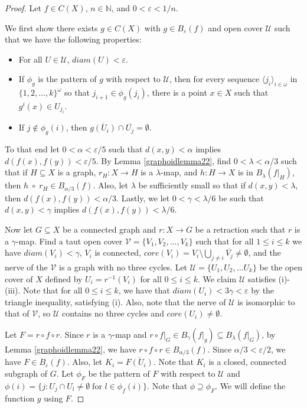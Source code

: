 \documentclass[10pt,a4paper]{amsart}
\numberwithin{equation}{section}
\begin{document}
\begin{proof}

Let $f\in C(X)$, $n\in \mathbb N$, and $0<\varepsilon<1/n$. 

We first show there exists $g\in C(X)$ with $g\in B_\varepsilon(f)$  and open cover $\mathcal{U}$ such that we have the following properties:
    \begin{itemize}
        \item[(i)]  For all $U\in \mathcal{U}$, $diam(U)<\varepsilon$.
        \item[(ii)] If $\phi_g$ is the pattern of $g$ with respect to $\mathcal{U}$, then for every sequence $\langle j_i \rangle_{i\in \omega}$ in $\{1,2,...,k\}^\omega$ so that $j_{i+1}\in \phi_g(j_i)$, there is a point $x\in X$ such that $g^i(x)\in U_{j_i}.$
        \item[(iii)] If $j\notin\phi_g(i)$, then $\overline{g(U_i)}\cap \overline{U_j}=\emptyset.$
    \end{itemize}


To that end let $0<\alpha<\varepsilon/5$ such that $d(x,y)<\alpha$ implies $d(f(x),f(y))<\varepsilon/5$. By Lemma \ref{graphoidlemma22}, find $0<\lambda<\alpha/3$ such that if $H\subseteq X$ is a graph, $r_H:X\to H$ is a $\lambda$-map, and $h:H\to X$ is in $B_\lambda(f|_H)$, then $h\;\circ\; r_H\in B_{\alpha/3}(f).$ Also, let $\lambda$ be sufficiently small so that if $d(x,y)<\lambda$, then $d(f(x),f(y))<\alpha/3$. Lastly, we let $0<\gamma<\lambda/6$ be such that $d(x,y)<\gamma$ implies $d(f(x),f(y))<\lambda/6$.

Now let $G\subseteq X$ be a connected graph and $r:X\to G$ be a retraction such that $r$ is a $\gamma$-map. Find a taut open cover $\mathcal{V}=\{V_1,V_2,...,V_k\}$ such that for all $1\leq i\leq k$ we have $diam(V_i)<\gamma$, $V_i$ is connected, $core(V_i)=V_i\setminus\bigcup_{j\neq i}\overline{V_j}\neq \emptyset$, and the nerve of the $\mathcal{V}$ is a graph with no three cycles. Let $\mathcal{U}=\{U_1,U_2,...U_k\}$ be the open cover of $X$ defined by $U_i=r^{-1}(V_i)$ for all $0\leq i\leq k$. We claim $\mathcal{U}$ satisfies (i)-(iii). Note that for all $0\leq i\leq k$, we have that $diam(U_i)<3\gamma<\varepsilon$ by the triangle inequality, satisfying (i). Also, note that the nerve of $\mathcal{U}$ is isomorphic to that of $\mathcal{V}$, so $\mathcal{U}$ contains no three cycles and $core(U_i)\neq\emptyset.$ 

Let $F=r\circ f\circ r$. Since $r$ is a $\gamma$-map and $r\circ f|_G\in B_\gamma(f|_g)\subseteq B_\lambda(f|_G)$, by Lemma \ref{graphoidlemma22}, we have $r\circ f\circ r\in B_{\alpha/3}(f).$ Since $\alpha/3<\varepsilon/2$, we have $F\in B_\varepsilon(f).$ Also, let $K_i=\overline{F(U_i)}.$ Note that $K_i$ is a closed, connected subgraph of $G$. Let $\phi_F$ be the pattern of $F$ with respect to $\mathcal{U}$ and $\phi(i)=\{j:U_j\cap U_l\neq \emptyset\; \text{for } l\in \phi_f(i)\}$. Note that $\phi \supseteq \phi_F$. We will define the function $g$ using $F$.


\end{proof}
\end{document}
